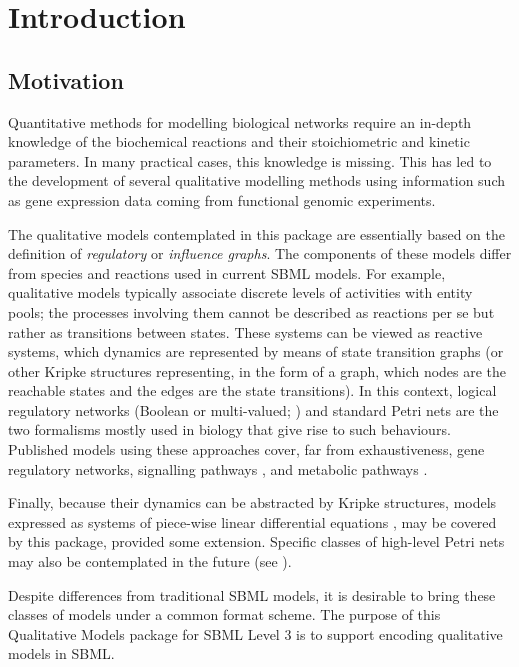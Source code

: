 
\section{Introduction}
\label{intro}

\subsection{Motivation}

Quantitative methods for modelling biological networks require an
in-depth knowledge of the biochemical reactions and their stoichiometric
and kinetic parameters. In many practical cases, this knowledge is
missing. This has led to the development of several qualitative
modelling methods using information such as gene expression data coming
from functional genomic experiments.

The qualitative models contemplated in this package are essentially
based on the definition of \emph{regulatory} or \emph{influence
  graphs}. The components of these models differ from species and
reactions used in current SBML models. For example, qualitative models
typically associate discrete levels of activities with entity pools; the
processes involving them cannot be described as reactions per se but
rather as transitions between states. These systems can be viewed as
reactive systems, which dynamics are represented by means of state
transition graphs (or other Kripke structures representing, in the form
of a graph, which nodes are the reachable states and the edges are the
state transitions). In this context, logical regulatory networks
(Boolean or multi-valued; \citealt{kauffman69,thomas91}) and standard Petri
nets \citep{chaouiya07} are the two formalisms mostly used in biology
that give rise to such behaviours. Published models using these approaches cover, far from exhaustiveness, gene regulatory networks, signalling pathways \cite[e.g.][]{thieffry95,sanchez03,albert03,faure06,mendoza06,helikar08,naldi10,calzone10}, and metabolic pathways \cite[see review by][]{chaouiya07}. 

Finally, because their dynamics can be abstracted by Kripke structures, models expressed as systems of piece-wise linear differential equations \citep{batt05}, may be covered by this package, provided some extension. Specific classes of high-level Petri nets may also be contemplated in the future (see ).

 Despite differences from traditional SBML models, it is desirable to
 bring these classes of models under a common format scheme. The purpose
 of this Qualitative Models package for SBML Level 3 is to support
 encoding qualitative models in SBML.

